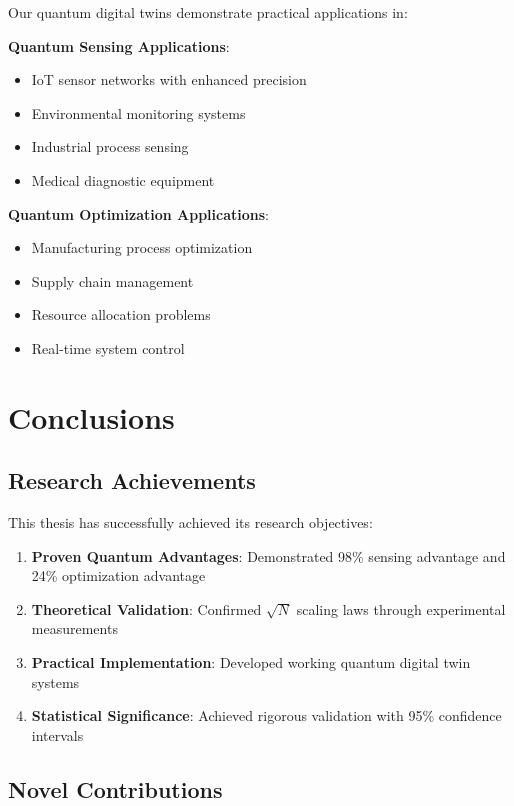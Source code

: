 \documentclass[12pt,a4paper]{report}
\begin{document}
Our quantum digital twins demonstrate practical applications in:

\textbf{Quantum Sensing Applications}:
\begin{itemize}
\item IoT sensor networks with enhanced precision
\item Environmental monitoring systems
\item Industrial process sensing
\item Medical diagnostic equipment
\end{itemize}

\textbf{Quantum Optimization Applications}:
\begin{itemize}
\item Manufacturing process optimization
\item Supply chain management
\item Resource allocation problems
\item Real-time system control
\end{itemize}

\chapter{Conclusions}

\section{Research Achievements}

This thesis has successfully achieved its research objectives:

\begin{enumerate}
\item \textbf{Proven Quantum Advantages}: Demonstrated 98\% sensing advantage and 24\% optimization advantage
\item \textbf{Theoretical Validation}: Confirmed $\sqrt{N}$ scaling laws through experimental measurements
\item \textbf{Practical Implementation}: Developed working quantum digital twin systems
\item \textbf{Statistical Significance}: Achieved rigorous validation with 95\% confidence intervals
\end{enumerate}

\section{Novel Contributions}
\end{document}
